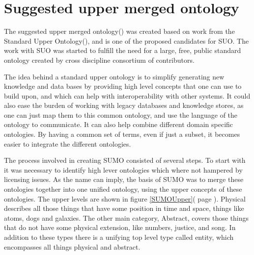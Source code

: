 %
%
%


\section{Suggested upper merged ontology}
The suggested upper merged ontology() was created based on work from the Standard Upper Ontology(), 
and is one of the proposed candidates for SUO.
The work with SUO was started to fulfill the need for a large, free, public standard ontology
created by cross discipline consortium of contributors.

The idea behind a standard upper ontology is to simplify generating new knowledge and data bases 
by providing high level concepts that one can use to build upon, 
and which can help with interoperability with other systems. 
It could also ease the burden of working with legacy databases and knowledge stores, 
as one can just map them to this common ontology, and use the language of the ontology to communicate.
It can also help combine different domain specific ontologies. 
By having a common set of terms, even if just a subset, 
it becomes easier to integrate the different ontologies\citep{Niles2001}.

The process involved in creating SUMO consisted of several steps.
To start with it was necessary to identify high lever ontologies which where not hampered by licensing issues.
As the name can imply, the basis of SUMO was to merge these ontologies together into one unified ontology,
using the upper concepts of these ontologies. 
The upper levels are shown in figure \ref{SUMOUpper}( page \pageref{SUMOUpper}).
Physical describes all those things that have some position in time and space, things like atoms, dogs and galaxies.
The other main category, Abstract, covers those things that do not have some physical extension, like numbers,
justice, and song.
In addition to these types there is a unifying top level type called entity, which encompasses all things physical and abstract.

